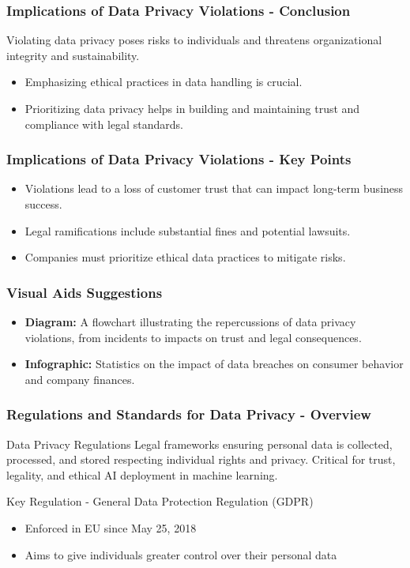 \documentclass[aspectratio=169]{beamer}
\begin{document}
\begin{frame}[fragile]
    \frametitle{Implications of Data Privacy Violations - Conclusion}
    Violating data privacy poses risks to individuals and threatens organizational integrity and sustainability. 
    \begin{itemize}
        \item Emphasizing ethical practices in data handling is crucial.
        \item Prioritizing data privacy helps in building and maintaining trust and compliance with legal standards.
    \end{itemize}
\end{frame}

\begin{frame}[fragile]
    \frametitle{Implications of Data Privacy Violations - Key Points}
    \begin{itemize}
        \item Violations lead to a loss of customer trust that can impact long-term business success.
        \item Legal ramifications include substantial fines and potential lawsuits.
        \item Companies must prioritize ethical data practices to mitigate risks.
    \end{itemize}
\end{frame}

\begin{frame}[fragile]
    \frametitle{Visual Aids Suggestions}
    \begin{itemize}
        \item \textbf{Diagram:} A flowchart illustrating the repercussions of data privacy violations, from incidents to impacts on trust and legal consequences.
        \item \textbf{Infographic:} Statistics on the impact of data breaches on consumer behavior and company finances.
    \end{itemize}
\end{frame}

\begin{frame}[fragile]
    \frametitle{Regulations and Standards for Data Privacy - Overview}
    
    \begin{block}{Data Privacy Regulations}
        Legal frameworks ensuring personal data is collected, processed, and stored respecting individual rights and privacy. 
        Critical for trust, legality, and ethical AI deployment in machine learning.
    \end{block}
    
    \begin{block}{Key Regulation - General Data Protection Regulation (GDPR)}
        \begin{itemize}
            \item Enforced in EU since May 25, 2018
            \item Aims to give individuals greater control over their personal data
        \end{itemize}
    \end{block}
\end{frame}
\end{document}
